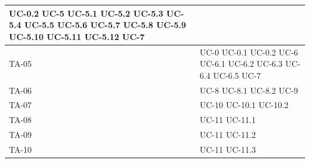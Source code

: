 \documentclass[8pt]{article}
\begin{document}
\begin{longtable}{|>{\centering}p{4cm}|>{\centering\arraybackslash}p{4cm}|}
            UC-0.2 \newline
            UC-5 \newline 
            UC-5.1 \newline
            UC-5.2 \newline
            UC-5.3 \newline
            UC-5.4 \newline
            UC-5.5 \newline
            UC-5.6 \newline
            UC-5.7 \newline
            UC-5.8 \newline
            UC-5.9 \newline
            UC-5.10 \newline
            UC-5.11 \newline
            UC-5.12 \newline
            UC-7
    \\
    \hline
    TA-05 & UC-0 \newline
            UC-0.1 \newline
            UC-0.2 \newline
            UC-6 \newline 
            UC-6.1 \newline
            UC-6.2 \newline
            UC-6.3 \newline
            UC-6.4 \newline
            UC-6.5 \newline
            UC-7
    \\
    \hline
    TA-06 & UC-8 \newline
            UC-8.1 \newline
            UC-8.2 \newline
            UC-9
    \\
    \hline
    TA-07 & UC-10 \newline
            UC-10.1 \newline
            UC-10.2
    \\
    \hline
    TA-08 & UC-11 \newline
            UC-11.1
    \\
    \hline
    TA-09 & UC-11 \newline
            UC-11.2
    \\
    \hline
    TA-10 & UC-11 \newline
            UC-11.3
    \\

\end{longtable}
\end{document}
